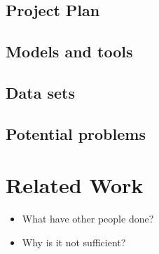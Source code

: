 \documentclass[rnd]{mas_proposal}
\begin{document}
\subsection{Project Plan}

    \subsection{Models and tools}

    \subsection{Data sets}

    \subsection{Potential problems}
    


\section{Related Work}
\begin{itemize}
    \item What have other people done?
    \item Why is it not sufficient?
\end{itemize}




\nocite{*}

\end{document}
